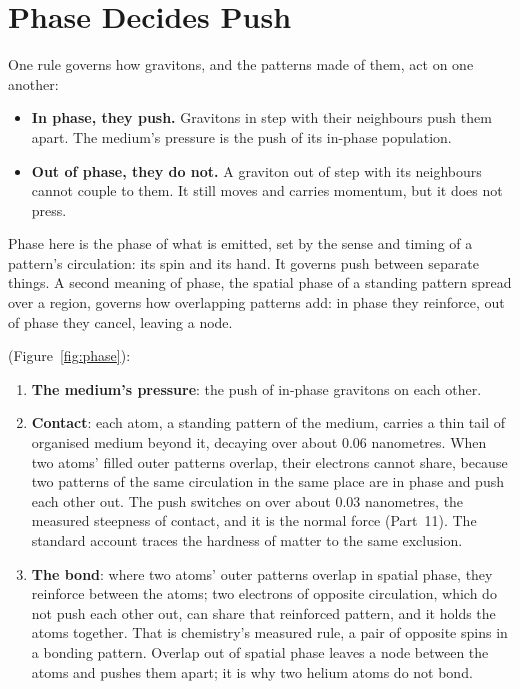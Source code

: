 \documentclass[11pt,a4paper]{article}
\begin{document}
\section{Phase Decides Push}
\label{sec:phase}

\begin{hypbar}
One rule governs how gravitons, and the patterns made of them, act on one another:
\begin{itemize}
\item \textbf{In phase, they push.} Gravitons in step with their neighbours push them apart. The medium's pressure is the push of its in-phase population.
\item \textbf{Out of phase, they do not.} A graviton out of step with its neighbours cannot couple to them. It still moves and carries momentum, but it does not press.
\end{itemize}
Phase here is the phase of what is emitted, set by the sense and timing of a pattern's circulation: its spin and its hand. It governs push between separate things. A second meaning of phase, the spatial phase of a standing pattern spread over a region, governs how overlapping patterns add: in phase they reinforce, out of phase they cancel, leaving a node.
\end{hypbar}

 (Figure~\ref{fig:phase}):
\begin{enumerate}
\item \textbf{The medium's pressure}: the push of in-phase gravitons on each other.
\item \textbf{Contact}: each atom, a standing pattern of the medium, carries a thin tail of organised medium beyond it, decaying over about 0.06 nanometres. When two atoms' filled outer patterns overlap, their electrons cannot share, because two patterns of the same circulation in the same place are in phase and push each other out. The push switches on over about 0.03 nanometres, the measured steepness of contact, and it is the normal force (Part~11). The standard account traces the hardness of matter to the same exclusion.
\item \textbf{The bond}: where two atoms' outer patterns overlap in spatial phase, they reinforce between the atoms; two electrons of opposite circulation, which do not push each other out, can share that reinforced pattern, and it holds the atoms together. That is chemistry's measured rule, a pair of opposite spins in a bonding pattern. Overlap out of spatial phase leaves a node between the atoms and pushes them apart; it is why two helium atoms do not bond.
\end{enumerate}
\end{document}
